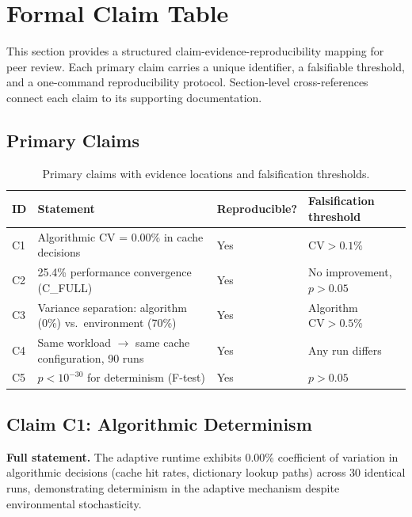 
\section{Formal Claim Table}
\label{sec:formal-claims}

This section provides a structured claim-evidence-reproducibility mapping
for peer review. Each primary claim carries a unique identifier, a falsifiable
threshold, and a one-command reproducibility protocol. Section-level
cross-references connect each claim to its supporting documentation.

\subsection{Primary Claims}

\begin{table}[h]
\centering
\caption{Primary claims with evidence locations and falsification thresholds.}
\label{tab:primary-claims}
\begin{tabular}{llll}
\toprule
\textbf{ID} & \textbf{Statement} & \textbf{Reproducible?} & \textbf{Falsification threshold} \\
\midrule
C1 & Algorithmic CV = 0.00\% in cache decisions & Yes &
     $\text{CV} > 0.1\%$ \\
C2 & 25.4\% performance convergence (C\_FULL) & Yes &
     No improvement, $p > 0.05$ \\
C3 & Variance separation: algorithm (0\%) vs.\ environment (70\%) & Yes &
     Algorithm $\text{CV} > 0.5\%$ \\
C4 & Same workload $\to$ same cache configuration, 90 runs & Yes &
     Any run differs \\
C5 & $p < 10^{-30}$ for determinism (F-test) & Yes &
     $p > 0.05$ \\
\bottomrule
\end{tabular}
\end{table}

\subsection{Claim C1: Algorithmic Determinism}

\textbf{Full statement.} The adaptive runtime exhibits 0.00\% coefficient of
variation in algorithmic decisions (cache hit rates, dictionary lookup paths)
across 30 identical runs, demonstrating determinism in the adaptive mechanism
despite environmental stochasticity.

